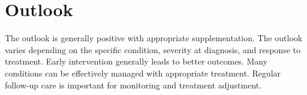 \section{Outlook}
The outlook is generally positive with appropriate supplementation. The outlook varies depending on the specific condition, severity at diagnosis, and response to treatment. Early intervention generally leads to better outcomes. Many conditions can be effectively managed with appropriate treatment. Regular follow-up care is important for monitoring and treatment adjustment.
